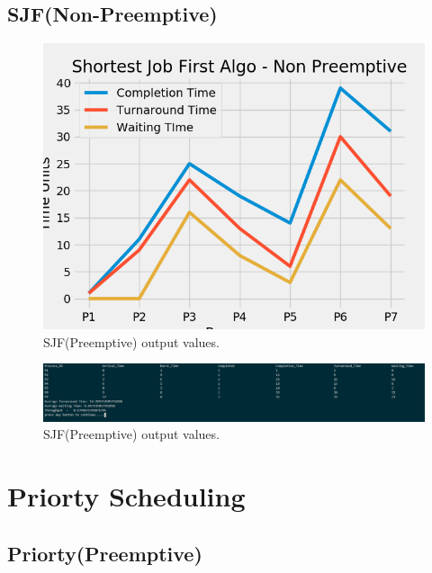 \documentclass[11pt,a4paper]{report}
\begin{document}
\section{SJF(Non-Preemptive)}

{\begin{figure}[H]
	\centering
	\includegraphics[scale=0.75]{./img/SJF_NP_output.png}
	\caption{SJF(Preemptive) output values.}
\end{figure}}

{\begin{figure}[H]
	\centering
	\includegraphics[scale=0.4]{./img/sjf_np_out.PNG}
	\caption{SJF(Preemptive) output values.}
\end{figure}}


\chapter{Priorty Scheduling}
\section{Priorty(Preemptive)}
\end{document}
